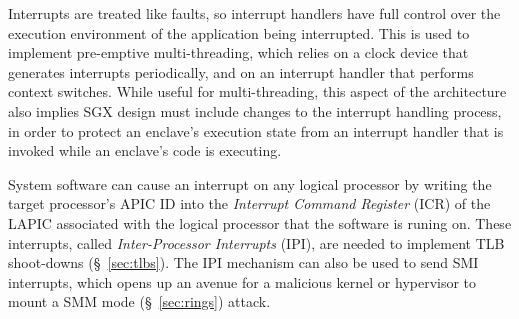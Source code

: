 Interrupts are treated like faults, so interrupt handlers have full control
over the execution environment of the application being interrupted. This is
used to implement pre-emptive multi-threading, which relies on a clock device
that generates interrupts periodically, and on an interrupt handler that
performs context switches. While useful for multi-threading, this aspect of the
architecture also implies SGX design must include changes to the interrupt
handling process, in order to protect an enclave's execution state from an
interrupt handler that is invoked while an enclave's code is executing.

System software can cause an interrupt on any logical processor by writing the
target processor's APIC ID into the \textit{Interrupt Command Register} (ICR)
of the LAPIC associated with the logical processor that the software is runing
on. These interrupts, called \textit{Inter-Processor Interrupts} (IPI), are
needed to implement TLB shoot-downs (\S~\ref{sec:tlbs}). The IPI mechanism can
also be used to send SMI interrupts, which opens up an avenue for a malicious
kernel or hypervisor to mount a SMM mode (\S~\ref{sec:rings}) attack.

